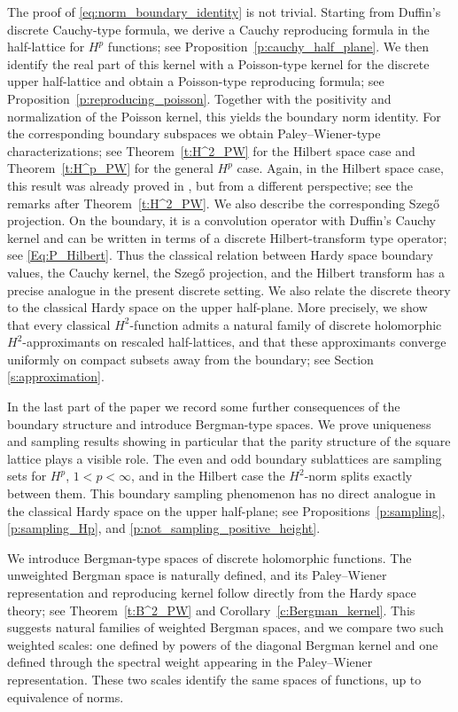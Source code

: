 \documentclass[12pt,a4paper,reqno]{amsart}
\theoremstyle{definition}
\theoremstyle{definition}\newtheorem{defn}[thm]{Definition}
\begin{document}
    
    The proof of \eqref{eq:norm_boundary_identity} is not trivial. Starting from Duffin's discrete Cauchy-type formula, we derive a Cauchy reproducing
    formula in the half-lattice for $H^p$ functions; see Proposition~\ref{p:cauchy_half_plane}. We then
    identify the real part of this kernel with a Poisson-type kernel for the discrete
    upper half-lattice and obtain a Poisson-type reproducing formula; see
    Proposition~\ref{p:reproducing_poisson}. Together with the positivity and normalization of the Poisson kernel, this yields the boundary norm identity. 
    For the corresponding boundary subspaces we obtain Paley--Wiener-type characterizations; see
    Theorem~\ref{t:H^2_PW} for the Hilbert space case and
    Theorem~\ref{t:H^p_PW} for the general $H^p$ case. Again, in the Hilbert space case,
    this result was already proved in \cite{ZD}, but from a different perspective; see the remarks after Theorem~\ref{t:H^2_PW}. We also describe the
    corresponding Szeg\H{o} projection. On the boundary, it is a convolution
    operator with Duffin's Cauchy kernel and can be written in terms of a discrete
    Hilbert-transform type operator; see \eqref{Eq:P_Hilbert}. Thus the classical
    relation between Hardy space boundary values, the Cauchy kernel, the
    Szeg\H{o} projection, and the Hilbert transform has a precise analogue in the
    present discrete setting. We also relate the discrete theory to the classical Hardy space on the upper half-plane. More precisely, we show that every classical $H^2$-function admits a natural family of discrete holomorphic $H^2$-approximants on rescaled half-lattices, and that these approximants converge uniformly on compact subsets away from the boundary; see Section \ref{s:approximation}. 
    
    In the last part of the paper we record some further consequences of the
    boundary structure and introduce Bergman-type spaces. We prove uniqueness and sampling
    results  showing in particular that the parity structure of the square lattice
    plays a visible role. The even and odd boundary sublattices are sampling sets
    for $H^p$, $1<p<\infty$, and in the Hilbert case the $H^2$-norm splits exactly
    between them. This boundary sampling phenomenon has no direct analogue in the
    classical Hardy space on the upper half-plane; see Propositions~\ref{p:sampling},
    \ref{p:sampling_Hp}, and \ref{p:not_sampling_positive_height}.
    
    
     We introduce Bergman-type spaces of
    discrete holomorphic functions. The unweighted Bergman space is naturally defined, and its Paley--Wiener representation and reproducing kernel follow directly from the Hardy space theory; see
    Theorem~\ref{t:B^2_PW} and Corollary~\ref{c:Bergman_kernel}. This suggests
    natural families of weighted Bergman spaces, and we compare two such weighted
    scales: one defined by powers of the diagonal Bergman kernel and one defined
    through the spectral weight appearing in the Paley--Wiener representation.
    These two scales identify the same spaces of functions, up to
    equivalence of norms.
    
\end{document}
